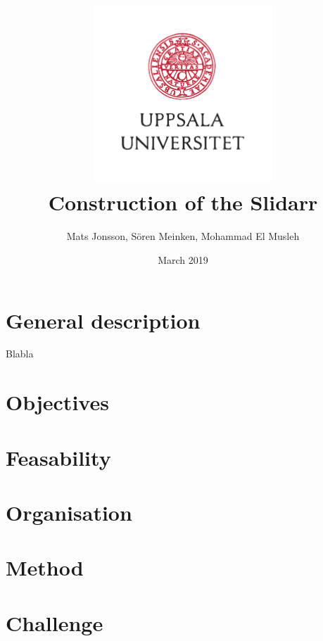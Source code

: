 \documentclass{article}
\title{\includegraphics[width=0.5\textwidth]{UU_logo.pdf}\\
Construction of the Slidarr}
\author{Mats Jonsson, Sören Meinken, Mohammad El Musleh}
\date{March 2019}
\begin{document}
\maketitle

\section{General description}
Blabla

\section{Objectives}

\section{Feasability}

\section{Organisation}

\section{Method}

\section{Challenge}
\end{document}
